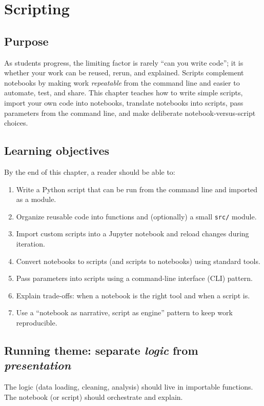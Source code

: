 \chapter{Scripting}
\label{ch:scripts-vs-notebooks}

\section*{Purpose}
As students progress, the limiting factor is rarely ``can you write code''; it is whether your work can be reused, rerun, and explained. Scripts complement notebooks by making work \emph{repeatable} from the command line and easier to automate, test, and share. This chapter teaches how to write simple scripts, import your own code into notebooks, translate notebooks into scripts, pass parameters from the command line, and make deliberate notebook-versus-script choices.

\section*{Learning objectives}
By the end of this chapter, a reader should be able to:
\begin{enumerate}
\item Write a Python script that can be run from the command line and imported as a module.
\item Organize reusable code into functions and (optionally) a small \texttt{src/} module.
\item Import custom scripts into a Jupyter notebook and reload changes during iteration.
\item Convert notebooks to scripts (and scripts to notebooks) using standard tools.
\item Pass parameters into scripts using a command-line interface (CLI) pattern.
\item Explain trade-offs: when a notebook is the right tool and when a script is.
\item Use a ``notebook as narrative, script as engine'' pattern to keep work reproducible.
\end{enumerate}

\section*{Running theme: separate \emph{logic} from \emph{presentation}}
The logic (data loading, cleaning, analysis) should live in importable functions. The notebook (or script) should orchestrate and explain.

